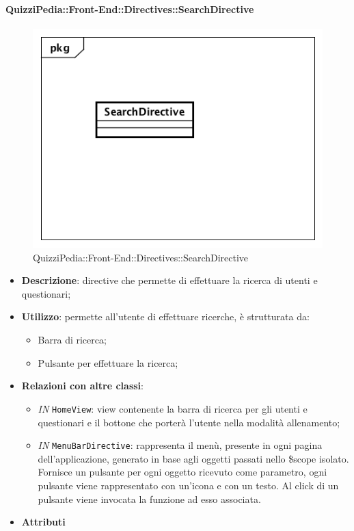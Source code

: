 \paragraph{QuizziPedia::Front-End::Directives::SearchDirective}

\label{QuizziPedia::Front-End::Directives::SearchDirective}

\begin{figure}[h]
	\centering
	\includegraphics[scale=0.5,keepaspectratio]{UML/Classi/Front-End/QuizziPedia_Front-end_Directives_SearchDirective.png}
	\caption{QuizziPedia::Front-End::Directives::SearchDirective}
\end{figure}

\begin{itemize}
	\item \textbf{Descrizione}: directive che permette di effettuare la ricerca di utenti e questionari;
	\item \textbf{Utilizzo}: permette all'utente di effettuare ricerche, è strutturata da:
	\begin{itemize}
		\item Barra di ricerca;
		\item Pulsante per effettuare la ricerca;
	\end{itemize}
	\item \textbf{Relazioni con altre classi}:
	\begin{itemize}
			\item \textit{IN} \texttt{HomeView}: view contenente la barra di ricerca per gli utenti e questionari e il bottone che porterà l'utente nella modalità allenamento;
		\item \textit{IN} \texttt{MenuBarDirective}: rappresenta il menù, presente in ogni pagina dell'applicazione, generato in base agli oggetti passati nello \$scope isolato. Fornisce un pulsante per ogni oggetto ricevuto come parametro, ogni pulsante viene rappresentato con un’icona e con un testo. Al click di un pulsante viene invocata la funzione ad esso associata.
	\end{itemize}
	\item \textbf{Attributi}
\end{itemize}

